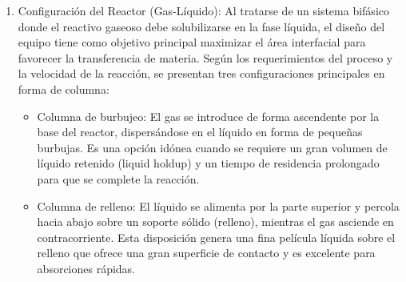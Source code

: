 \begin{enumerate}[label=\Roman*.]
	      \begin{equation*}
		      \frac{dr_A}{dz} = 0
	      \end{equation*}
	      \begin{equation*}
		      0 = Ad \cdot \frac{E_d}{RT^2} \cdot \text{exp}\left(\frac{-E_d}{RT}\right) - C_{A0} \cdot (1-X_A) - A_i \cdot \left(\frac{-E_i}{RT}\right) \cdot \text{exp}\left(\frac{-E_i}{RT}\right) \cdot C_{A0} \cdot X_A
	      \end{equation*}
	      y todo esto si lo ponemos en función de la conversión queda tal que:
	      \begin{equation*}
		      \frac{X_A}{1-X_A} = \frac{A_d \cdot E_D}{A_i \cdot E_i} \cdot \text{exp}\left(\frac{E_i-E_d}{RT}\right)
	      \end{equation*}
	      finalmente despejamos la temperatura:
	      \begin{equation*}
		      T_{\text{opt}} = \dfrac{E_i-E_d}{R \cdot \text{ln}\left(\dfrac{\dfrac{1-X_A}{X_A}}{\dfrac{A_d \cdot E_D}{A_i \cdot E_i}}\right)}
	      \end{equation*}
	      \newpage
	\item Configuración del Reactor (Gas-Líquido): Al tratarse de un sistema bifásico donde el reactivo gaseoso debe solubilizarse en la fase líquida, el diseño del equipo tiene como objetivo principal maximizar el área interfacial para favorecer la transferencia de materia. Según los requerimientos del proceso y la velocidad de la reacción, se presentan tres configuraciones principales en forma de columna:
	      \begin{itemize}
		      \item Columna de burbujeo: El gas se introduce de forma ascendente por la base del reactor, dispersándose en el líquido en forma de pequeñas burbujas. Es una opción idónea cuando se requiere un gran volumen de líquido retenido (liquid holdup) y un tiempo de residencia prolongado para que se complete la reacción.

		      \item Columna de relleno: El líquido se alimenta por la parte superior y percola hacia abajo sobre un soporte sólido (relleno), mientras el gas asciende en contracorriente. Esta disposición genera una fina película líquida sobre el relleno que ofrece una gran superficie de contacto y es excelente para absorciones rápidas.


\end{itemize}
\end{enumerate}
